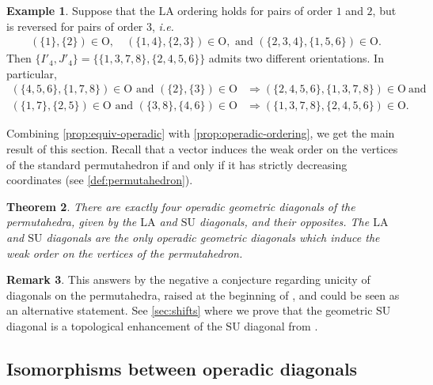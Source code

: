 \documentclass{amsart}
\newtheorem{theorem}{Theorem}[section]
\theoremstyle{definition}
\newtheorem{example}[theorem]{Example}
\newtheorem{remark}[theorem]{Remark}
\newcommand{\Or}{\mathrm{O}} %
\newcommand{\ie}{\textit{i.e.}~} %
\newcommand{\SU}{\mathrm{SU}}
\newcommand{\LA}{\mathrm{LA}}
\begin{document}
\begin{example} 
\label{ex:Non-coherent order contradiction}
Suppose that the $\LA$ ordering holds for pairs of order $1$ and $2$, but is reversed for pairs of order $3$, \ie
\begin{align*}
	(\{1\}, \{2\}) \in \Or, \quad (\{1,4\}, \{2,3\}) \in \Or, \text{ and } (\{2, 3, 4\}, \{1, 5, 6 \}) \in \Or.
\end{align*}
Then $\{I'_4,J'_4\}=\{\{1, 3, 7, 8\}, \{2, 4, 5, 6\}\}$ admits two different orientations.
In particular, 
\begin{align*}
	(\{ 4, 5, 6 \} , \{1, 7, 8\}) \in \Or \text{ and } (\{2\}, \{3\}) \in \Or & \Longrightarrow (\{2, 4, 5, 6\}, \{1, 3, 7, 8\} ) \in \Or \ \text{and} \\
	(\{1, 7\}, \{2, 5\}) \in \Or \text{ and } (\{3, 8\}, \{4, 6\}) \in \Or & \Longrightarrow (\{1, 3, 7, 8\}, \{2, 4, 5, 6\}) \in \Or.
\end{align*}
\end{example}

Combining \cref{prop:equiv-operadic} with \cref{prop:operadic-ordering}, we get the main result of this section.
Recall that a vector induces the weak order on the vertices of the standard permutahedron if and only if it has strictly decreasing coordinates (see \cref{def:permutahedron}).

\begin{theorem}
\label{prop:unique-operad}
There are exactly four operadic geometric diagonals of the permutahedra, given by the $\LA$ and $\SU$ diagonals, and their opposites. 
The $\LA$ and $\SU$ diagonals are the only operadic geometric diagonals which induce the weak order on the vertices of the permutahedron.
\end{theorem}

\begin{remark}
This answers by the negative a conjecture regarding unicity of diagonals on the permutahedra, raised at the beginning of \cite[Sect.~3]{SaneblidzeUmble}, and could be seen as an alternative statement. 
See \cref{sec:shifts} where we prove that the geometric $\SU$ diagonal is a topological enhancement of the $\SU$ diagonal from \cite{SaneblidzeUmble}.
\end{remark}


\subsection{Isomorphisms between operadic diagonals}
\label{subsec:isos-LA-SU}
\end{document}
